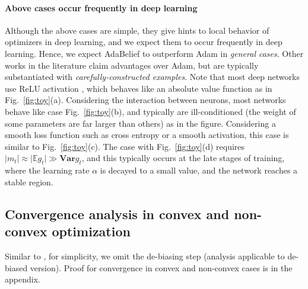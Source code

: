 \documentclass{article}
\begin{document}
\paragraph{Above cases occur frequently in deep learning}
\label{sec:frequency}
Although the above cases are simple, they give hints to local behavior of optimizers in deep learning, and we expect them to occur frequently in deep learning. Hence, we expect AdaBelief to outperform Adam in \textit{general cases}.
Other works in the literature \cite{reddi2019convergence, luo2019adaptive} claim advantages over Adam, but are typically substantiated with \textit{carefully-constructed examples}.
Note that most deep networks use ReLU activation \cite{glorot2011deep}, which behaves like an absolute value function as in Fig.~\ref{fig:toy}(a). Considering the interaction between neurons, most networks behave like case Fig.~\ref{fig:toy}(b), and typically are ill-conditioned (the weight of some parameters are far larger than others) as in the figure. Considering a smooth loss function such as cross entropy or a smooth activation, this case is similar to Fig.~\ref{fig:toy}(c). The case with Fig.~\ref{fig:toy}(d) requires $\vert m_t \vert \approx \vert \mathbb{E}g_t \vert \gg \mathbf{Var} g_t$, and this typically occurs at the late stages of training, where the learning rate $\alpha$ is decayed to a small value, and the network reaches a stable region.
\subsection{Convergence analysis in convex and non-convex optimization}
Similar to \cite{reddi2019convergence, luo2019adaptive, chen2018convergence}, 
for simplicity, we omit the de-biasing step (analysis applicable to de-biased version). Proof for convergence in convex and non-convex cases is in the appendix. 
\end{document}
